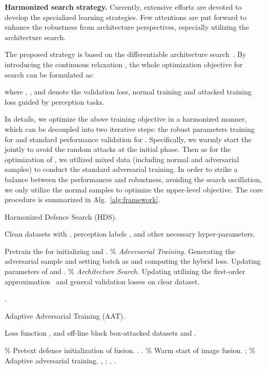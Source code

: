 \documentclass[sigconf]{acmart}
\begin{document}
\textbf{Harmonized search strategy.} 
Currently, extensive efforts are devoted to develop the specialized learning strategies. Few attentions are put forward to enhance the robustness from  architecture perspectives, especially utilizing the architecture search.


The proposed 
strategy is based on the differentiable architecture search~\cite{liu2018darts,liu2022optimization,liu2021towards}. By introducing the continuous relaxation , the whole optimization objective for search can be formulated as:

where , , and  denote the validation loss, normal training and attacked training loss guided by perception tasks. 

In details, we optimize  the above training objective in a harmonized manner, which can be decoupled into two iterative steps: the robust parameters training for  and standard performance validation for .  Specifically, we warmly start the  jointly to avoid the random attacks at the initial phase. 
Then as for the optimization of , we utilized mixed data (including normal and adversarial samples)  to conduct the standard adversarial training. In order to strike a balance between the performances and robustness, avoiding the search oscillation, we only utilize the normal samples to optimize the upper-level objective. The core procedure is summarized in Alg.~\ref{alg:framework}.
\begin{algorithm}[htb] 
	\caption{Harmonized Defence Search (HDS).}\label{alg:framework}
	\begin{algorithmic}[1] 
		\REQUIRE Clean datasets with , perception labels ,  and other necessary hyper-parameters.


		\STATE Pretrain the  for initializing  and .
		\STATE \% \emph{Adversarial Training.} 
		\STATE Generating the adversarial sample and setting batch as  and computing the hybrid loss. Updating parameters of  and .
		\STATE \% \emph{Architecture Search.} 
		\STATE Updating  utilizing the first-order approximation~\cite{liu2022revisiting} and general validation losses on clear dataset.
		\ENDWHILE
		
		\RETURN  .
	\end{algorithmic}
\end{algorithm}


\begin{algorithm}[thb] 
	\caption{Adaptive Adversarial Training (AAT).}\label{alg:training}
	\begin{algorithmic}[1] 
		\REQUIRE Loss function , and off-line black box-attacked datasets  and .


		\STATE \% Pretext defence initialization of fusion.
		\STATE . 
		\ENDFOR
		\STATE . 
		\ENDWHILE
		\STATE \% Warm start of image fusion.
		\STATE  ;
		\STATE \% Adaptive adversarial training.
		\STATE  , ;
		\RETURN  , .
	\end{algorithmic}
\end{algorithm}
\end{document}

